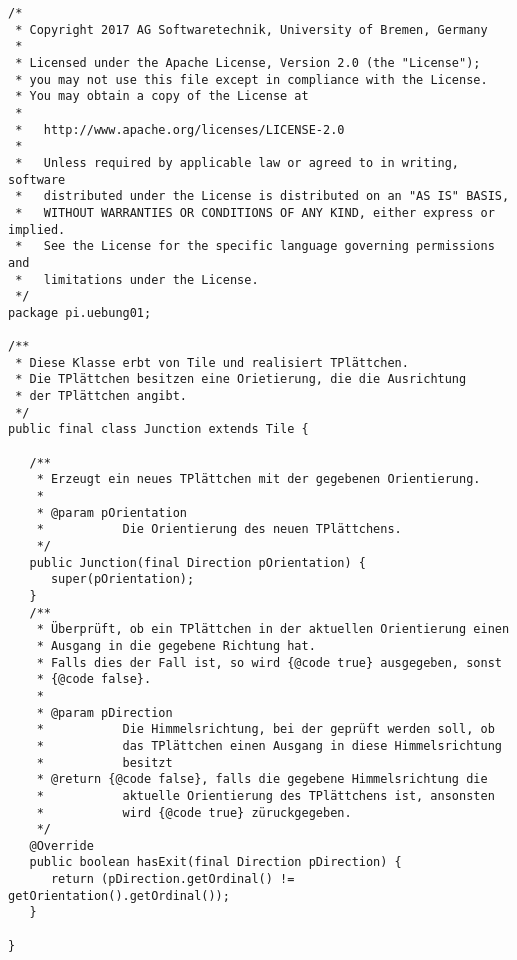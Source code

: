 \documentclass{pi2}
\begin{document}
\begin{lstlisting}
/*
 * Copyright 2017 AG Softwaretechnik, University of Bremen, Germany
 *
 * Licensed under the Apache License, Version 2.0 (the "License");
 * you may not use this file except in compliance with the License.
 * You may obtain a copy of the License at
 *
 *   http://www.apache.org/licenses/LICENSE-2.0
 *
 *   Unless required by applicable law or agreed to in writing, software
 *   distributed under the License is distributed on an "AS IS" BASIS,
 *   WITHOUT WARRANTIES OR CONDITIONS OF ANY KIND, either express or implied.
 *   See the License for the specific language governing permissions and
 *   limitations under the License.
 */
package pi.uebung01;

/**
 * Diese Klasse erbt von Tile und realisiert TPlättchen.
 * Die TPlättchen besitzen eine Orietierung, die die Ausrichtung
 * der TPlättchen angibt.
 */
public final class Junction extends Tile {

   /**
    * Erzeugt ein neues TPlättchen mit der gegebenen Orientierung.
    *
    * @param pOrientation
    *           Die Orientierung des neuen TPlättchens.
    */
   public Junction(final Direction pOrientation) {
      super(pOrientation);
   }
   /**
    * Überprüft, ob ein TPlättchen in der aktuellen Orientierung einen
    * Ausgang in die gegebene Richtung hat.
    * Falls dies der Fall ist, so wird {@code true} ausgegeben, sonst
    * {@code false}.
    * 
    * @param pDirection
    * 			Die Himmelsrichtung, bei der geprüft werden soll, ob
    * 			das TPlättchen einen Ausgang in diese Himmelsrichtung
    * 			besitzt
    * @return {@code false}, falls die gegebene Himmelsrichtung die
    * 			aktuelle Orientierung des TPlättchens ist, ansonsten
    * 			wird {@code true} züruckgegeben.
    */
   @Override
   public boolean hasExit(final Direction pDirection) {
      return (pDirection.getOrdinal() != getOrientation().getOrdinal());
   }

}

\end{lstlisting}
\end{document}

